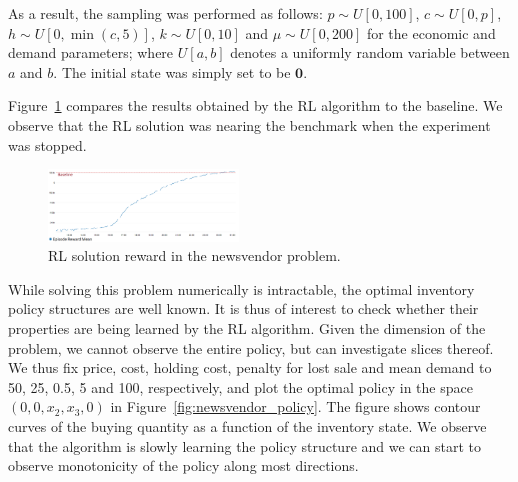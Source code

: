 As a result, the sampling was performed as follows: $p\sim U[0,100]$, $c\sim U[0,p]$, $h\sim U[0,\min(c, 5)]$, $k\sim U[0,10]$ and $\mu\sim U[0,200]$ for the economic and demand parameters; where $U[a,b]$ denotes a uniformly random variable between $a$ and $b$.  The initial state was simply set to be $\mathbf{0}$.


Figure~\ref{fig:newsvendor_PPO} compares the results obtained by the RL algorithm to the baseline. We observe that the RL solution was nearing the benchmark when the experiment was stopped.


\begin{figure}
\centering
        \includegraphics[width=0.45\textwidth]{images/newsvendor_edit.png}
    \caption{RL solution reward in the newsvendor problem.}
    \label{fig:newsvendor_PPO}
    	\vspace{-1em}
\end{figure}

While solving this problem numerically is intractable, the optimal inventory policy structures are well known. It is thus of interest to check whether their properties are being learned by the RL algorithm. Given the dimension of the problem, we cannot observe the entire policy, but can investigate slices thereof. We thus fix price, cost, holding cost, penalty for lost sale and mean demand to 50, 25, 0.5, 5 and 100, respectively, and plot the optimal policy in the space $(0,0,x_2,x_3,0)$ in Figure~\ref{fig:newsvendor_policy}. The figure shows contour curves of the buying quantity as a function of the inventory state. We observe that the algorithm is slowly learning the policy structure and we can start to observe monotonicity of the policy along most directions.

